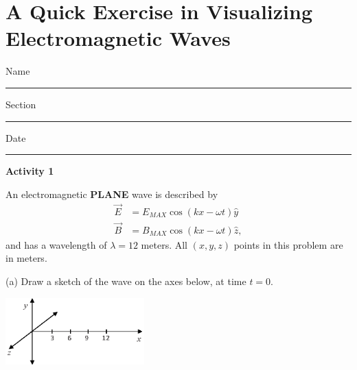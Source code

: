 \section{A Quick Exercise in Visualizing Electromagnetic Waves}

Name \rule{2.0in}{0.1pt}\hfill{}Section \rule{1.0in}{0.1pt}\hfill{}Date
\rule{1.0in}{0.1pt}

\vspace{0.1in}
%

\textbf{Activity 1}

An electromagnetic \textbf{PLANE} wave is described by
\begin{align*}
\vec E &= E_{MAX} \cos \left ( kx - \omega t \right ) \hat y\\
\vec B &= B_{MAX} \cos \left ( kx - \omega t \right ) \hat z,
\end{align*}
and has a wavelength of $\lambda =12$ meters.  All $(x,y,z)$ points in this problem are in meters.
\vspace{0.1in}

(a) Draw a sketch of the wave on the axes below, at time $t=0$.
\begin{center}
\includegraphics[width=0.4\textwidth]{em_plane_waves/em_waves_axes.eps}
\end{center}


